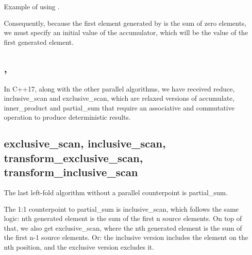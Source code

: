 \begin{box-note}
\footnotesize Example of using .
\tcblower
{}
\end{box-note}

Consequently, because the first element generated by  is the sum of zero elements, we must specify an initial value of the accumulator, which will be the value of the first generated element.



\subsection{\texorpdfstring{,\newline{}}{\texttt{std::transform\_inclusive\_scan},\newline \texttt{std::transform\_exclusive\_scan}}}


In C++17, along with the other parallel algorithms, we have received reduce, inclusive\_scan and exclusive\_scan, which are relaxed versions of accumulate, inner\_product and partial\_sum that require an associative and commutative operation to produce deterministic results.

\subsection{exclusive\_scan, inclusive\_scan, transform\_exclusive\_scan, transform\_inclusive\_scan}

The last left-fold algorithm without a parallel counterpoint is partial\_sum.



The 1:1 counterpoint to partial\_sum is inclusive\_scan, which follows the same logic: nth generated element is the sum of the first n source elements. On top of that, we also get exclusive\_scan, where the nth generated element is the sum of the first n-1 source elements. Or: the inclusive version includes the element on the nth position, and the exclusive version excludes it.



